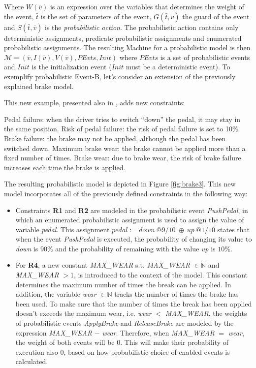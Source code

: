 Where $W( \bar{v})$ is an expression over the variables that determines the weight of the event, $\bar{t}$ is the set of parameters of the event, $G(\bar{t}, \bar{v})$ the guard of the event and $S(\bar{t}, \bar{v})$ is the \textit{probabilistic action}. The probabilistic action contains only deterministic assignments, predicate probabilistic assignments and enumerated probabilistic assignments. The resulting Machine for a probabilistic model is then $\mathscr{M} =(\bar{v}, I(\bar{v}), V(\bar{v}), PEvts, Init)$ where $PEvts$ is a set of probabilistic events and $Init$ is the initialization event ($Init$ must be a deterministic event). To exemplify probabilistic Event-B, let's consider an extension of the previously explained brake model. 

\begin{example}
\normalfont
This new example, presented also in \cite{Aouadhi2017}, adds new constraints:
\begin{itemize}
    \itema Pedal failure: when the driver tries to switch “down” the pedal, it may stay in the same position.
    \itemb Risk of pedal failure: the risk of pedal failure is set to 10\%.
    \itemc Brake failure: the brake may not be applied, although the pedal has been switched down.
    \itemd Maximum brake wear: the brake cannot be applied more than a fixed number of times.
    \iteme Brake wear: due to brake wear, the risk of brake failure increases each time the brake is applied.
\end{itemize}
The resulting probabilistic model is depicted in Figure \ref{fig:brake3}. This new model incorporates all of the previously defined constraints in the following way:
\begin{itemize}
    \item Constraints \textbf{R1} and \textbf{R2} are modeled in the probabilistic event \textit{PushPedal}, in which an enumerated probabilistic assignment is used to assign the value of variable \textit{pedal}. This assignment $pedal := down \ @9/10  \ \oplus \ up \ @1/10$ states that when the event \textit{PushPedal} is executed, the probability of changing its value to \textit{down} is $90\%$ and the probability of remaining with the value \textit{up} is $10\%$.
    \item For \textbf{R4}, a new constant \textit{MAX\_WEAR} s.t. \textit{MAX\_WEAR} $\in \mathbb{N}$ and \textit{MAX\_WEAR} $> 1$, is introduced to the context of the model. This constant determines the maximum number of times the break can be applied. In addition, the variable \textit{wear} $\in \mathbb{N}$ tracks the number of times the brake has been used. To make sure that the number of times the break has been applied doesn't exceeds the maximum wear, i.e. \textit{wear} $<$ \textit{MAX\_WEAR}, the weights of probabilistic events \textit{ApplyBrake} and \textit{ReleaseBrake} are modeled by the expression \textit{MAX\_WEAR} $-$ \textit{wear}. Therefore, when \textit{MAX\_WEAR} $=$ \textit{wear}, the weight of both events will be 0. This will make their probability of execution also 0, based on how probabilistic choice of enabled events is calculated.

\end{itemize}
\end{example}
